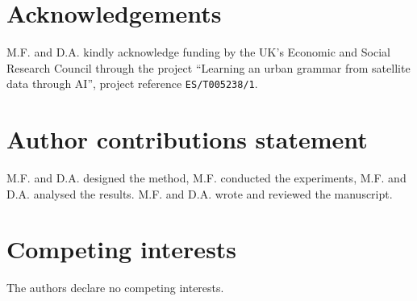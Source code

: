 \documentclass[fleqn,10pt]{wlscirep}
\begin{document}
\section*{Acknowledgements}
M.F. and D.A. kindly acknowledge funding by the UK's Economic and Social Research
Council through the project ``Learning an urban grammar from satellite data
through AI'', project reference \texttt{ES/T005238/1}.
\section*{Author contributions statement}
M.F. and D.A. designed the method, M.F. conducted the experiments, M.F. and D.A.
analysed the results. M.F. and D.A. wrote and reviewed the manuscript.
\section*{Competing interests}
The authors declare no competing interests.
\end{document}
